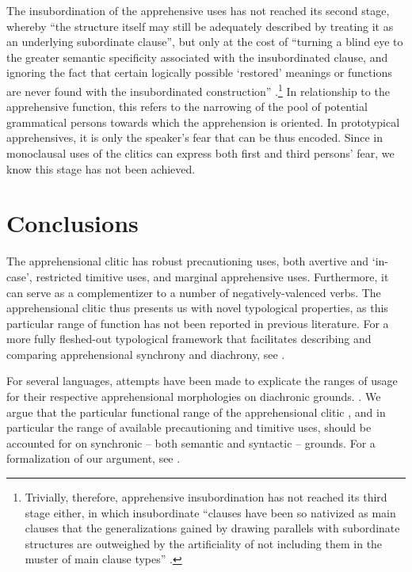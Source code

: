 \documentclass[output=paper,colorlinks,citecolor=brown]{langscibook}
\begin{document}
The insubordination of the apprehensive uses has not reached its second stage, whereby ``the structure itself may still be adequately described by treating it as an underlying subordinate clause'', but only at the cost of ``turning a blind eye to the greater semantic specificity associated with the insubordinated clause, and ignoring the fact that certain logically possible `restored' meanings or functions are never found with the insubordinated construction'' \citep[430--431]{evans2007insubordination}.\footnote{Trivially, therefore, apprehensive insubordination has not reached its third stage either, in which insubordinate ``clauses have been so nativized as main clauses that the generalizations gained by drawing parallels with subordinate structures are outweighed by the artificiality of not including them in the muster of main clause types'' \citep[431]{evans2007insubordination}.} In relationship to the apprehensive function, this refers to the narrowing of the pool of potential grammatical persons towards which the apprehension is oriented. In prototypical apprehensives, it is only the speaker's fear that can be thus encoded. Since in  monoclausal uses of the  clitics can express both first and third persons' fear, we know this stage has not been achieved.




\section{Conclusions}\label{sec:conclusions}

The  apprehensional clitic  has robust precautioning uses, both avertive and `in-case', restricted timitive uses, and marginal apprehensive uses. Furthermore, it can serve as a complementizer to a number of negatively-valenced verbs. The apprehensional clitic  thus presents us with novel typological properties, as this particular range of function has not been reported in previous literature.
For a more fully fleshed-out typological framework that facilitates describing and comparing apprehensional synchrony and diachrony, see \citet{anderbois-llc}.

For several languages, attempts have been made to explicate the ranges of usage for their respective apprehensional morphologies on diachronic grounds. \citep[among others,][]{lichtenberk1995apprehensional, dobrushina2017fear, wiemer2018major}. We argue that the particular functional range of the  apprehensional clitic , and in particular the range of available precautioning and timitive uses, should be accounted for on synchronic -- both semantic and syntactic -- grounds.
For a formalization of our argument, see \citet{dabkowski2024jos}.
\end{document}

